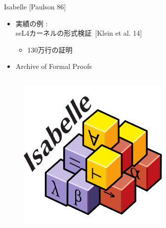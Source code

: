 \documentclass[17pt,aspectratio=169]{beamer}
\begin{document}
\begin{frame}{Isabelle {\small [Paulson 86]}}
    \vspace{-5pt}
    \begin{itemize}[itemsep=3pt]
        \item 実績の例 : \\
            seL4カーネルの形式検証 {\small \,[Klein et al. 14]}
            \vspace{-3pt}
            \begin{itemize}[itemsep=2pt]
                \item 130万行の証明
            \end{itemize}
        \item Archive of Formal Proofs
    \end{itemize}
    
    \begin{columns}
        \begin{column}{0.25\textwidth}
            \begin{figure}
                \includegraphics[width=0.7\linewidth]{./images/isabelle_logo.png}
            \end{figure}
        \end{column}
        \begin{column}{0.25\textwidth}
            \vspace{-7pt}
            \begin{figure}

\end{figure}
\end{column}
\end{columns}
\end{frame}
\end{document}
